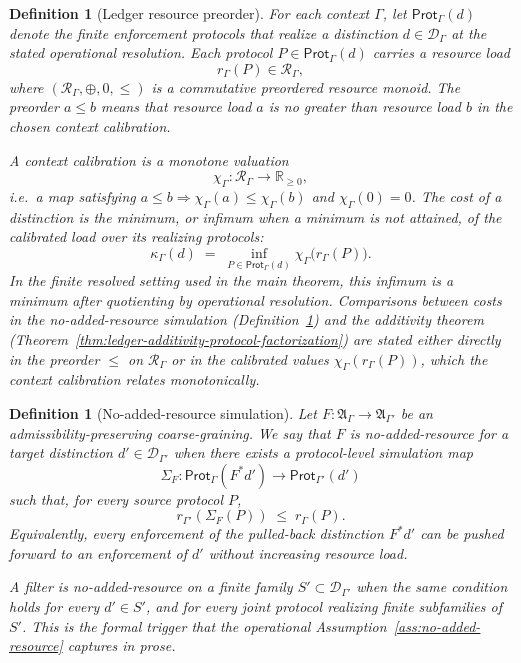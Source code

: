 \documentclass[11pt]{article}
\newtheorem{definition}[theorem]{Definition}
\newcommand{\A}{\mathfrak A}
\newcommand{\R}{\mathbb R}
\begin{document}
\begin{definition}[Ledger resource preorder]\label{def:ledger-resource-preorder}
For each context $\Gamma$, let $\mathsf{Prot}_\Gamma(d)$ denote the
finite enforcement protocols that realize a distinction
$d\in\mathcal D_\Gamma$ at the stated operational resolution.  Each
protocol $P\in\mathsf{Prot}_\Gamma(d)$ carries a resource load
\[
    r_\Gamma(P)\in\mathcal R_\Gamma,
\]
where $(\mathcal R_\Gamma,\oplus,0,\le)$ is a commutative preordered
resource monoid.  The preorder $a\le b$ means that resource load $a$
is no greater than resource load $b$ in the chosen context calibration.

A \emph{context calibration} is a monotone valuation
\[
    \chi_\Gamma:\mathcal R_\Gamma\to\R_{\ge 0},
\]
i.e.\ a map satisfying $a\le b\Rightarrow \chi_\Gamma(a)\le\chi_\Gamma(b)$
and $\chi_\Gamma(0)=0$.  The cost of a distinction is the minimum, or
infimum when a minimum is not attained, of the calibrated load over
its realizing protocols:
\[
    \kappa_\Gamma(d)
    \;=\;
    \inf_{P\in\mathsf{Prot}_\Gamma(d)} \chi_\Gamma\bigl(r_\Gamma(P)\bigr).
\]
In the finite resolved setting used in the main theorem, this infimum
is a minimum after quotienting by operational resolution.  Comparisons
between costs in the no-added-resource simulation
(Definition~\ref{def:no-added-resource-simulation}) and the additivity
theorem (Theorem~\ref{thm:ledger-additivity-protocol-factorization})
are stated either directly in the preorder $\le$ on $\mathcal R_\Gamma$
or in the calibrated values $\chi_\Gamma(r_\Gamma(P))$, which the
context calibration relates monotonically.
\end{definition}

\begin{definition}[No-added-resource simulation]\label{def:no-added-resource-simulation}
Let $F:\A_\Gamma\to\A_{\Gamma'}$ be an admissibility-preserving
coarse-graining.  We say that $F$ is \emph{no-added-resource} for a
target distinction $d'\in\mathcal D_{\Gamma'}$ when there exists a
protocol-level simulation map
\[
    \Sigma_F:\mathsf{Prot}_\Gamma(F^*d')
    \longrightarrow
    \mathsf{Prot}_{\Gamma'}(d')
\]
such that, for every source protocol $P$,
\[
    r_{\Gamma'}(\Sigma_F(P)) \;\le\; r_\Gamma(P).
\]
Equivalently, every enforcement of the pulled-back distinction $F^*d'$
can be pushed forward to an enforcement of $d'$ without increasing
resource load.

A filter is no-added-resource on a finite family
$S'\subset\mathcal D_{\Gamma'}$ when the same condition holds for every
$d'\in S'$, and for every joint protocol realizing finite subfamilies
of $S'$.  This is the formal trigger that the operational
Assumption~\ref{ass:no-added-resource} captures in prose.
\end{definition}
\end{document}
